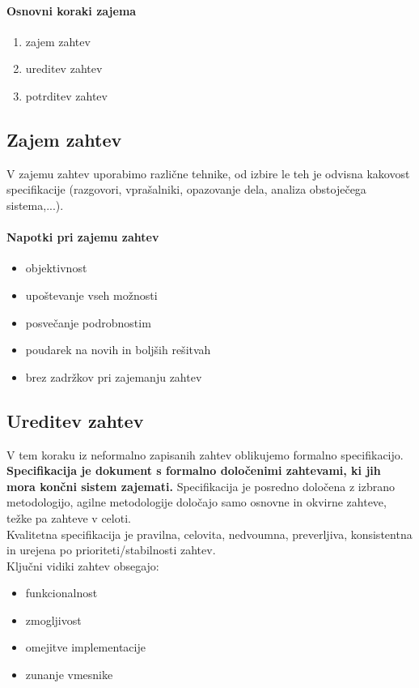 \documentclass[a4paper,12pt]{report}
\begin{document}
   \paragraph{Osnovni koraki zajema}\mbox{}
   \begin{enumerate}
      \item zajem zahtev
      \item ureditev zahtev
      \item potrditev zahtev
   \end{enumerate}

   \subsection{Zajem zahtev}
   V zajemu zahtev uporabimo različne tehnike, od izbire le teh je odvisna kakovost specifikacije (razgovori, vprašalniki, 
   opazovanje dela, analiza obstoječega sistema,...).

   \paragraph{Napotki pri zajemu zahtev}
   \begin{itemize}
      \item objektivnost
      \item upoštevanje vseh možnosti
      \item posvečanje podrobnostim
      \item poudarek na novih in boljših rešitvah
      \item brez zadržkov pri zajemanju zahtev
   \end{itemize}

   \subsection{Ureditev zahtev}
   V tem koraku iz neformalno zapisanih zahtev oblikujemo formalno specifikacijo. \textbf{Specifikacija je dokument s formalno določenimi
   zahtevami, ki jih mora končni sistem zajemati.} Specifikacija je posredno določena z izbrano metodologijo, agilne metodologije določajo
   samo osnovne in okvirne zahteve, težke pa zahteve v celoti.\\

   
   Kvalitetna specifikacija je pravilna, celovita, nedvoumna, preverljiva, konsistentna in urejena po prioriteti/stabilnosti zahtev.
   \\
   
   Ključni vidiki zahtev obsegajo:
   \begin{itemize}
      \item funkcionalnost
      \item zmogljivost
      \item omejitve implementacije
      \item zunanje vmesnike
   \end{itemize}
   
\end{document}
